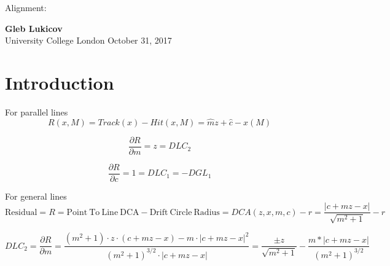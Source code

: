\documentclass[a4paper,11pt]{article}
\begin{document}
\thispagestyle{empty}
\begin{titlepage}
\begin{center}
\end{center}
\begin{center}
	\vspace{1cm}
	{\huge Alignment:}\\
	\vspace{1.5cm}

	\vspace{6cm}
	{\LARGE\bf Gleb Lukicov}\\
	{\Large University College London}
	\vspace{4cm}
	\vfill
	\vspace{0.9cm}
	{\large October 31, 2017}
\end{center}
\end{titlepage}
\clearpage

\thispagestyle{plain}
\section{Introduction} \label{sec:intro}

For parallel lines
\begin{equation}
R(x,M) = Track(x) - Hit(x,M) = \hat{m}z+\hat{c} - x(M)	
\end{equation}

\begin{equation}
\frac{ \partial R}{\partial m} = z	= DLC_2
\end{equation}

\begin{equation}
\frac{ \partial R}{\partial c} = 1	=DLC_1 = - DGL_1
\end{equation}

\clearpage

For general lines
\begin{equation}	
\mathrm{Residual}= R =\mathrm{Point \ To \ Line \ DCA} - \mathrm{Drift \ Circle \ Radius} = DCA(z,x,m,c) - r = \frac{ |c+mz-x| }  { \sqrt{m^2+1} } -r
\end{equation}


\begin{equation}
DLC_2 = \frac{ \partial R}{\partial m} = \frac{ (m^2+1)\cdot z\cdot(c+mz-x) - m\cdot |c+mz-x|^2 }{ (m^2+1)^{3/2} \cdot |c+mz-x|  } = \frac{\pm z}{\sqrt{m^2+1}} - \frac{m*|c+mz-x|}{(m^2+1)^{3/2}}
\end{equation}
\end{document}

